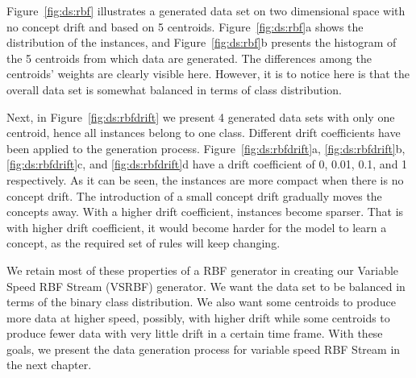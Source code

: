 Figure~\ref{fig:ds:rbf} illustrates a generated data set on two dimensional space with no concept drift and based on 5 centroids. Figure~\ref{fig:ds:rbf}a shows the distribution of the instances, and Figure~\ref{fig:ds:rbf}b presents the histogram of the 5 centroids from which data are generated. The differences among the centroids' weights are clearly visible here. However, it is to notice here is that the overall data set is somewhat balanced in terms of class distribution.

Next, in Figure~\ref{fig:ds:rbfdrift} we present 4 generated data sets with only one centroid, hence all instances belong to one class. Different drift coefficients have been applied to the generation process. Figure~\ref{fig:ds:rbfdrift}a, \ref{fig:ds:rbfdrift}b, \ref{fig:ds:rbfdrift}c, and \ref{fig:ds:rbfdrift}d have a drift coefficient of 0, 0.01, 0.1, and 1 respectively. As it can be seen, the instances are more compact when there is no concept drift. The introduction of a small concept drift gradually moves the concepts away. With a higher drift coefficient, instances become sparser. That is with higher drift coefficient, it would become harder for the model to learn a concept, as the required set of rules will keep changing.

We retain most of these properties of a RBF generator in creating our Variable Speed RBF Stream (VSRBF) generator. We want the data set to be balanced in terms of the binary class distribution. We also want some centroids to produce more data at higher speed, possibly, with higher drift while some centroids to produce fewer data with very little drift in a certain time frame. With these goals, we present the data generation process for variable speed RBF Stream in the next chapter.


